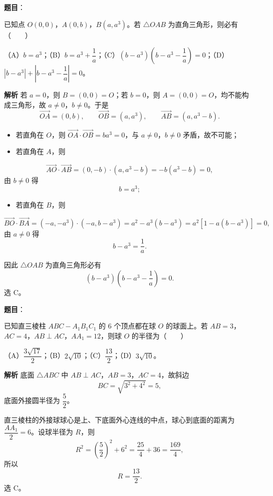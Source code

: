 \begin{answer}

\textbf{题目}：

已知点 $O(0,0)$，$A(0,b)$，$B(a,a^3)$。若 $\triangle OAB$ 为直角三角形，则必有\mbox{（　　）}

（A）$b=a^3$；（B）$b=a^3+\dfrac1a$；（C）$(b-a^3)\left(b-a^3-\dfrac1a\right)=0$；（D）$|b-a^3|+\left|b-a^3-\dfrac1a\right|=0$。

\textbf{解析}
若 $a=0$，则 $B=(0,0)=O$；若 $b=0$，则 $A=(0,0)=O$，均不能构成三角形，故 $a\neq0$，$b\neq0$。于是
\nopagebreak[4]
\[\overrightarrow{OA}=(0,b),\qquad \overrightarrow{OB}=(a,a^3),\qquad \overrightarrow{AB}=(a,a^3-b).\]

\begin{itemize}
\item 若直角在 $O$，则 $\overrightarrow{OA}\cdot\overrightarrow{OB}=ba^3=0$，与 $a\neq0$，$b\neq0$ 矛盾，故不可能；
\item 若直角在 $A$，则
\end{itemize}
\nopagebreak[4]
\[\overrightarrow{AO}\cdot\overrightarrow{AB}=(0,-b)\cdot(a,a^3-b)=-b(a^3-b)=0,\]
由 $b\neq0$ 得
\nopagebreak[4]
\[b=a^3;\]
\begin{itemize}
\item 若直角在 $B$，则
\end{itemize}
\nopagebreak[4]
\[\overrightarrow{BO}\cdot\overrightarrow{BA}=(-a,-a^3)\cdot(-a,b-a^3)=a^2-a^3(b-a^3)=a^2\left[1-a(b-a^3)\right]=0,\]
由 $a\neq0$ 得
\nopagebreak[4]
\[b-a^3=\frac1a.\]

因此 $\triangle OAB$ 为直角三角形必有
\nopagebreak[4]
\[(b-a^3)\left(b-a^3-\frac1a\right)=0.\]
选 C。


\end{answer}
\begin{answer}

\textbf{题目}：

已知直三棱柱 $ABC-A_1B_1C_1$ 的 $6$ 个顶点都在球 $O$ 的球面上。若 $AB=3$，$AC=4$，$AB\perp AC$，$AA_1=12$，则球 $O$ 的半径为\mbox{（　　）}

（A）$\dfrac{3\sqrt{17}}2$；（B）$2\sqrt{10}$；（C）$\dfrac{13}2$；（D）$3\sqrt{10}$。

\textbf{解析}
底面 $\triangle ABC$ 中 $AB\perp AC$，$AB=3$，$AC=4$，故斜边
\nopagebreak[4]
\[BC=\sqrt{3^2+4^2}=5,\]
底面外接圆半径为 $\dfrac52$。

直三棱柱的外接球球心是上、下底面外心连线的中点，球心到底面的距离为 $\dfrac{AA_1}2=6$。设球半径为 $R$，则
\nopagebreak[4]
\[R^2=\left(\frac52\right)^2+6^2=\frac{25}4+36=\frac{169}4,\]
所以
\nopagebreak[4]
\[R=\frac{13}2.\]
选 C。


\end{answer}
